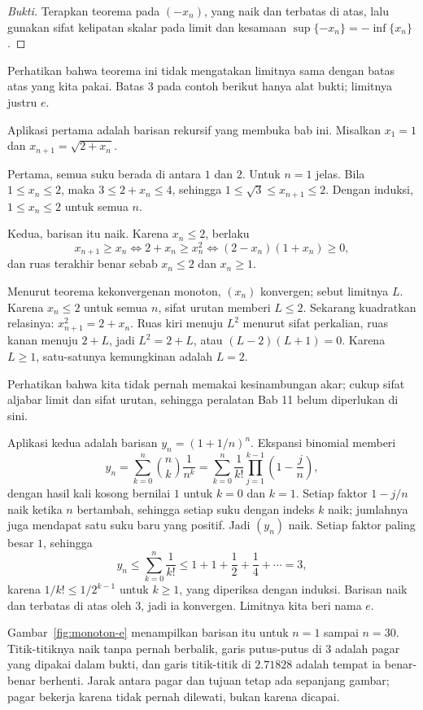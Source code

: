 \begin{proof}[Bukti]
Terapkan teorema pada $(-x_n)$, yang naik dan terbatas di atas, lalu gunakan sifat
kelipatan skalar pada limit dan kesamaan
$\sup\{-x_n\}=-\inf\{x_n\}$.
\end{proof}

Perhatikan bahwa teorema ini tidak mengatakan limitnya sama dengan batas atas yang
kita pakai. Batas $3$ pada contoh berikut hanya alat bukti; limitnya justru $e$.

Aplikasi pertama adalah barisan rekursif yang membuka bab ini. Misalkan $x_1=1$ dan
$x_{n+1}=\sqrt{2+x_n}$.

Pertama, semua suku berada di antara $1$ dan $2$. Untuk $n=1$ jelas. Bila
$1 \le x_n \le 2$, maka $3 \le 2+x_n \le 4$, sehingga
$1 \le \sqrt{3} \le x_{n+1} \le 2$. Dengan induksi, $1 \le x_n \le 2$ untuk semua
$n$.

Kedua, barisan itu naik. Karena $x_n \le 2$, berlaku
\[
x_{n+1} \ge x_n \iff 2+x_n \ge x_n^2 \iff (2-x_n)(1+x_n) \ge 0,
\]
dan ruas terakhir benar sebab $x_n \le 2$ dan $x_n \ge 1$.

Menurut teorema kekonvergenan monoton, $(x_n)$ konvergen; sebut limitnya $L$.
Karena $x_n \le 2$ untuk semua $n$, sifat urutan memberi $L \le 2$. Sekarang
kuadratkan relasinya: $x_{n+1}^2=2+x_n$. Ruas kiri menuju $L^2$ menurut sifat
perkalian, ruas kanan menuju $2+L$, jadi $L^2=2+L$, atau
$(L-2)(L+1)=0$. Karena $L \ge 1$, satu-satunya kemungkinan adalah $L=2$.

Perhatikan bahwa kita tidak pernah memakai kesinambungan akar; cukup sifat aljabar
limit dan sifat urutan, sehingga peralatan Bab 11 belum diperlukan di sini.

Aplikasi kedua adalah barisan $y_n=(1+1/n)^n$. Ekspansi binomial memberi
\[
y_n = \sum_{k=0}^{n} \binom{n}{k}\frac{1}{n^k}
= \sum_{k=0}^{n} \frac{1}{k!}\prod_{j=1}^{k-1}\left(1-\frac{j}{n}\right),
\]
dengan hasil kali kosong bernilai $1$ untuk $k=0$ dan $k=1$. Setiap faktor
$1-j/n$ naik ketika $n$ bertambah, sehingga setiap suku dengan indeks $k$ naik;
jumlahnya juga mendapat satu suku baru yang positif. Jadi $(y_n)$ naik. Setiap
faktor paling besar $1$, sehingga
\[
y_n \le \sum_{k=0}^{n}\frac{1}{k!} \le 1+1+\frac12+\frac14+\cdots = 3,
\]
karena $1/k! \le 1/2^{k-1}$ untuk $k \ge 1$, yang diperiksa dengan induksi.
Barisan naik dan terbatas di atas oleh $3$, jadi ia konvergen. Limitnya kita beri
nama $e$.

Gambar~\ref{fig:monoton-e} menampilkan barisan itu untuk $n=1$ sampai $n=30$.
Titik-titiknya naik tanpa pernah berbalik, garis putus-putus di $3$ adalah pagar
yang dipakai dalam bukti, dan garis titik-titik di $2.71828$ adalah tempat ia
benar-benar berhenti. Jarak antara pagar dan tujuan tetap ada sepanjang gambar;
pagar bekerja karena tidak pernah dilewati, bukan karena dicapai.

